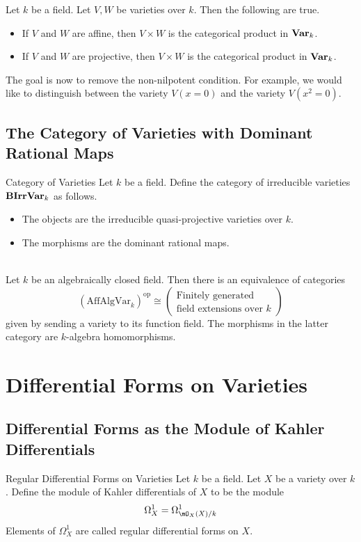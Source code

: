 \documentclass[a4paper]{article}
\begin{document}
\begin{lmm}{}{} Let $k$ be a field. Let $V,W$ be varieties over $k$. Then the following are true. 
\begin{itemize}
\item If $V$ and $W$ are affine, then $V\times W$ is the categorical product in $\bold{Var}_k$. 
\item If $V$ and $W$ are projective, then $V\times W$ is the categorical product in $\bold{Var}_k$. 
\end{itemize}
\end{lmm}

The goal is now to remove the non-nilpotent condition. For example, we would like to distinguish between the variety $V(x=0)$ and the variety $V(x^2=0)$. 

\subsection{The Category of Varieties with Dominant Rational Maps}
\begin{defn}{Category of Varieties}{} Let $k$ be a field. Define the category of irreducible varieties $\bold{BIrrVar}_k$ as follows. 
\begin{itemize}
\item The objects are the irreducible quasi-projective varieties over $k$. 
\item The morphisms are the dominant rational maps. 
\end{itemize}
\end{defn}

\begin{prp}{}{}\\
Let $k$ be an algebraically closed field. Then there is an equivalence of categories $$(\text{AffAlgVar}_k)^\text{op}\cong(\substack{\text{Finitely generated}\\\text{field extensions over }k})$$ given by sending a variety to its function field. The morphisms in the latter category are $k$-algebra homomorphisms. 
\end{prp}

\pagebreak
\section{Differential Forms on Varieties}
\subsection{Differential Forms as the Module of Kahler Differentials}
\begin{defn}{Regular Differential Forms on Varieties}{} Let $k$ be a field. Let $X$ be a variety over $k$. Define the module of Kahler differentials of $X$ to be the module $$\Omega_X^1=\Omega_{\mO_X(X)/k}^1$$ Elements of $\Omega_X^1$ are called regular differential forms on $X$. 
\end{defn}
\end{document}
